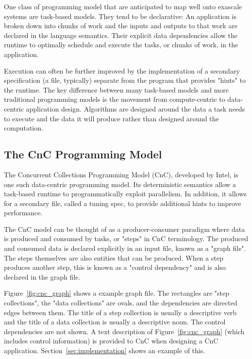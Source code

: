 One class of programming model that are anticipated to map well onto exascale 
systems are task-based models. They tend to be declarative: An application is
broken down into chunks of work and the inputs and outputs to that work are 
declared in the language semantics. Their explicit data dependencies allow the 
runtime to optimally schedule and execute the tasks, or chunks of work, in the 
application.

Execution can often be further improved by the implementation of a
secondary specification (a file, typically) separate from the program
that provides "hints" to the runtime. The key difference between many
task-based models and more traditional programming models is the
movement from compute-centric to data-centric application design.
Algorithms are designed around the data a task needs to execute and
the data it will produce rather than designed around the computation.

\subsection{The CnC Programming Model}
\label{sec:cnc}

The Concurrent Collections Programming Model (CnC), developed by
Intel, is one such data-centric programming model. Its deterministic
semantics allow a task-based runtime to programmatically exploit
parallelism. In addition, it allows for a secondary file, called a
tuning spec, to provide additional hints to improve performance.

The CnC model can be thought of as a producer-consumer paradigm where
data is produced and consumed by tasks, or "steps" in CnC
terminology. The produced and consumed data is declared explicitly in
an input file, known as a "graph file". The steps themselves are
also entities that can be produced. When a step produces another step,
this is known as a "control dependency" and is also declared in the
graph file.

Figure~\ref{fig:cnc_graph} shows a example graph file. The rectangles are
"step collections", the "data collections" are ovals, and the
dependencies are directed edges between them. The title of a step
collection is usually a descriptive verb and the title of a data
collection is usually a descriptive noun. The control dependencies are
not shown. A text description of Figure~\ref{fig:cnc_graph} (which
includes control information) is provided to CnC when designing a CnC
application.  Section~\ref{sec:implementation} shows an example of this.

